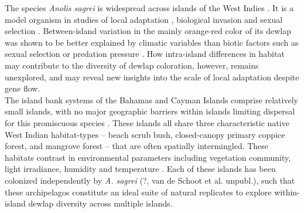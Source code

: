The species \textit{Anolis sagrei} is widespread across islands of the West Indies \citep{Reynolds2020}. It is a model organism in studies of local adaptation \citep{Losos1994, Losos1997a, Losos2001, Kolbe2012}, biological invasion \citep{Kolbe2008} and sexual selection \citep{Tokarz2002, Tokarz2005, Tokarz2006, Driessens2014, Steffen2014, Driessens2015}. Between-island variation in the mainly orange-red color of its dewlap was shown to be better explained by climatic variables \citep{Driessens2017} than biotic factors such as sexual selection or predation pressure \citep{Vanhooydonck2009, Baeckens2018}. How intra-island differences in habitat may contribute to the diversity of dewlap coloration, however, remains unexplored, and may reveal new insights into the scale of local adaptation despite gene flow.\\

The island bank systems of the Bahamas and Cayman Islands comprise relatively small islands, with no major geographic barriers within islands limiting dispersal for this promiscuous species \citep{Kamath2018}. These islands all share three characteristic native West Indian habitat-types -- beach scrub bush, closed-canopy primary coppice forest, and mangrove forest -- that are often spatially intermingled. These habitats contrast in environmental parameters including vegetation community, light irradiance, humidity and temperature \citep{Howard1950, Schoener1968}. Each of these islands has been colonized independently by \textit{A. sagrei} (\citealt{Driessens2017, Reynolds2020}?, van de Schoot et al. unpubl.), such that these archipelagos constitute an ideal suite of natural replicates to explore within-island dewlap diversity across multiple islands.\\


